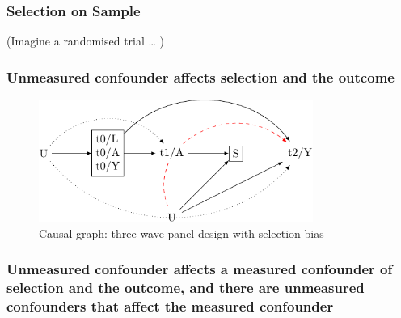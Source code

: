 \documentclass[
  singlecolumn]{report}
\begin{document}
\hypertarget{selection-on-sample}{%
\subsubsection{Selection on Sample}\label{selection-on-sample}}

(Imagine a randomised trial \ldots{} )

\hypertarget{unmeasured-confounder-affects-selection-and-the-outcome}{%
\subsubsection{Unmeasured confounder affects selection and the
outcome}\label{unmeasured-confounder-affects-selection-and-the-outcome}}

\begin{figure}

{\centering \includegraphics[width=0.8\textwidth,height=\textheight]{causal-dags_files/figure-pdf/fig-dag-8-1.pdf}

}

\caption{\label{fig-dag-8}Causal graph: three-wave panel design with
selection bias}

\end{figure}

\hypertarget{unmeasured-confounder-affects-a-measured-confounder-of-selection-and-the-outcome-and-there-are-unmeasured-confounders-that-affect-the-measured-confounder}{%
\subsubsection{Unmeasured confounder affects a measured confounder of
selection and the outcome, and there are unmeasured confounders that
affect the measured
confounder}\label{unmeasured-confounder-affects-a-measured-confounder-of-selection-and-the-outcome-and-there-are-unmeasured-confounders-that-affect-the-measured-confounder}}
\end{document}

